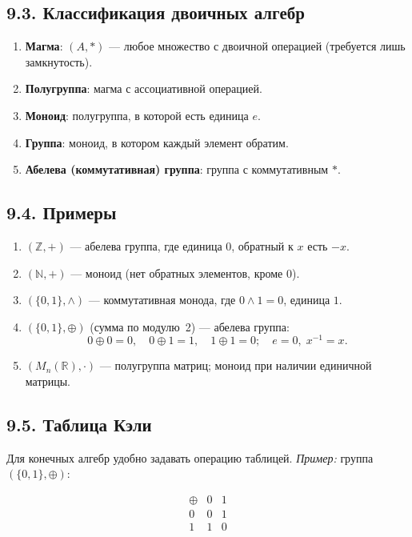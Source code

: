 \documentclass{article}
\begin{document}
\subsection*{9.3. Классификация двоичных алгебр}

\begin{enumerate}[label=\arabic*)]
  \item \textbf{Магма}: $(A,*)$ — любое множество с двоичной операцией (требуется лишь замкнутость).
  \item \textbf{Полугруппа}: магма с ассоциативной операцией.
  \item \textbf{Моноид}: полугруппа, в которой есть единица $e$.
  \item \textbf{Группа}: моноид, в котором каждый элемент обратим.
  \item \textbf{Абелева (коммутативная) группа}: группа с коммутативным $*$.
\end{enumerate}

\subsection*{9.4. Примеры}

\begin{enumerate}[label=\arabic*)]
  \item $(\mathbb{Z}, +)$ — абелева группа, где единица $0$, обратный к $x$ есть $-x$.
  \item $(\mathbb{N}, +)$ — моноид (нет обратных элементов, кроме $0$).
  \item $(\{0,1\}, \wedge)$ — коммутативная монода, где $0\wedge1=0$, единица $1$.
  \item $(\{0,1\}, \oplus)$ (сумма по модулю 2) — абелева группа:  
    \[
      0\oplus0=0,\quad 0\oplus1=1,\quad1\oplus1=0;
      \quad e=0,\;x^{-1}=x.
    \]
  \item $(M_n(\mathbb{R}), \cdot)$ — полугруппа матриц; моноид при наличии единичной матрицы.
\end{enumerate}

\subsection*{9.5. Таблица Кэли}

Для конечных алгебр удобно задавать операцию таблицей.  
\emph{Пример:} группа $(\{0,1\},\oplus)$:

\[
\begin{array}{c|cc}
\oplus & 0 & 1 \\ \hline
0 & 0 & 1 \\
1 & 1 & 0
\end{array}
\]
\end{document}
